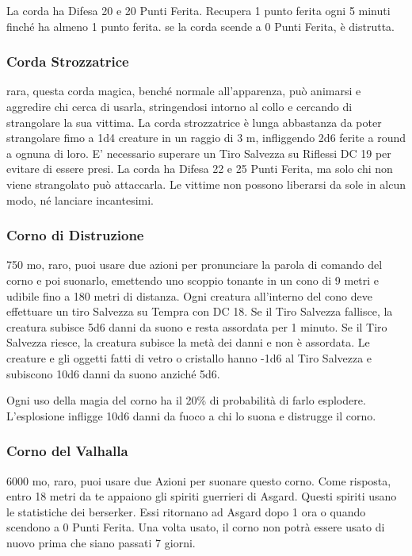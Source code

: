 \begin{multicols}{2}
	La corda ha Difesa 20 e 20 Punti Ferita. Recupera 1 punto ferita ogni 5 minuti finché ha almeno 1 punto ferita. se la corda scende a 0 Punti Ferita, è distrutta.

	\subsubsection*{Corda Strozzatrice}
	rara, questa corda magica, benché normale all'apparenza, può animarsi e aggredire chi cerca di usarla, stringendosi intorno al collo e cercando di strangolare la sua vittima. La corda strozzatrice è lunga abbastanza da poter strangolare fimo a 1d4 creature in un raggio di 3 m, infliggendo 2d6 ferite a round a ognuna di loro. E' necessario superare un Tiro Salvezza su Riflessi DC 19 per evitare di essere presi. La corda ha Difesa 22 e 25 Punti Ferita, ma solo chi non viene strangolato può attaccarla. Le vittime non possono liberarsi da sole in alcun modo, né lanciare incantesimi.

	\subsubsection*{Corno di Distruzione}
	750 mo, raro, puoi usare due azioni per pronunciare la parola di comando del corno e poi suonarlo, emettendo uno scoppio tonante in un cono di 9 metri e udibile fino a 180 metri di distanza. Ogni creatura all'interno del cono deve effettuare un tiro Salvezza su Tempra con DC 18. Se il Tiro Salvezza fallisce, la creatura subisce 5d6 danni da suono e resta assordata per 1 minuto. Se il Tiro Salvezza riesce, la creatura subisce la metà dei danni e non è assordata. Le creature e gli oggetti fatti di vetro o cristallo hanno -1d6 al Tiro Salvezza e subiscono 10d6 danni da suono anziché 5d6.

	Ogni uso della magia del corno ha il 20\% di probabilità di farlo esplodere. L'esplosione infligge 10d6 danni da fuoco a chi lo suona e distrugge il corno.

	\subsubsection*{Corno del Valhalla}
	6000 mo, raro, puoi usare due Azioni per suonare questo corno. Come risposta, entro 18 metri da te appaiono gli spiriti guerrieri di Asgard. Questi spiriti usano le statistiche dei berserker. Essi ritornano ad Asgard dopo 1 ora o quando scendono a 0 Punti Ferita. Una volta usato, il corno non potrà essere usato di nuovo prima che siano passati 7 giorni.



\end{multicols}
